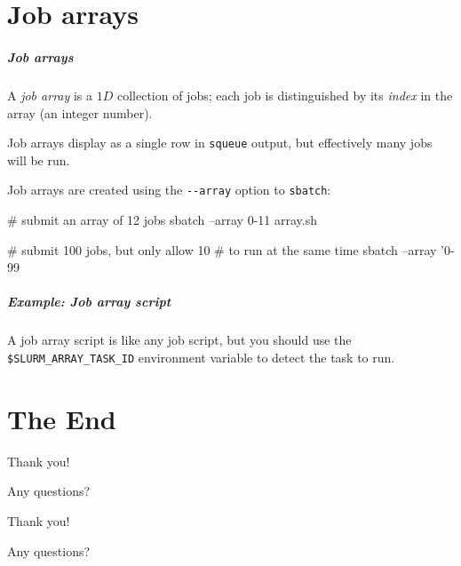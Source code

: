 \documentclass[english,serif,mathserif,usenames,dvipsnames]{beamer}
\begin{document}
\part{Job arrays}

\begin{frame}[fragile]
  \frametitle{Job arrays}

  A \emph{job array} is a $1D$ collection of jobs; each job is
  distinguished by its \emph{index} in the array (an integer number).

  \+ Job arrays display as a single row in \texttt{squeue} output, but
  effectively many jobs will be run.

  \+
  Job arrays are created using the \texttt{-{}-array} option to \texttt{sbatch}:
  \begin{sh}
  # submit an array of 12 jobs
  sbatch --array 0-11 array.sh

  # submit 100 jobs, but only allow 10
  # to run at the same time
  sbatch --array '0-99%
  \end{sh}

\end{frame}


\begin{frame}[fragile]
  \frametitle{Example: Job array script}
  \small

  A job array script is like any job script, but you should use the
  \texttt{\$SLURM\_ARRAY\_TASK\_ID} environment variable to detect the
  task to run.

\end{frame}


\part{The End}
\begin{frame}[fragile]
  \centering

  \begin{center}
    \begin{Huge}
      Thank you!
    \end{Huge}

    \+
    \begin{Large}
      Any questions?
    \end{Large}
  \end{center}
\end{frame}

\begin{frame}[fragile]
  \centering

  \begin{center}
    \begin{Large}
      Thank you!
    \end{Large}

    \+
    \begin{Huge}
      Any questions?
    \end{Huge}
  \end{center}
\end{frame}
\end{document}
